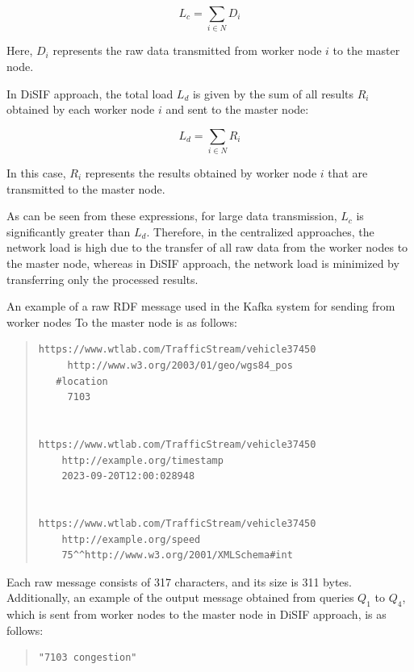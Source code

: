 \documentclass[5p,times]{elsarticle}
\begin{document}
\begin{equation}
    L_c = \sum_{i \in N} D_i
    \end{equation}

Here, \(D_i\) represents the raw data transmitted from worker node \(i\) to the master node.

In DiSIF approach, the total load \(L_d\) is given by the sum of all results \(R_i\)
 obtained by each worker node \(i\) and sent to the master node:


\begin{equation}
    L_d = \sum_{i \in N} R_i
\end{equation}
    
In this case, \(R_i\) represents the results obtained by worker node \(i\)
 that are transmitted to the master node.

As can be seen from these expressions, for large data transmission, \(L_c\)
 is significantly greater than \(L_d\). Therefore, in the centralized approaches,
  the network load is high due to the transfer of all raw data from the worker nodes
   to the master node, whereas in DiSIF approach, the network load is minimized by transferring
    only the processed results.




An example of a raw RDF message used in the Kafka system for sending from worker nodes To
 the master node is as follows:

\small
\begin{quote}
\begin{verbatim}
https://www.wtlab.com/TrafficStream/vehicle37450
	 http://www.w3.org/2003/01/geo/wgs84_pos
   #location
	 7103


https://www.wtlab.com/TrafficStream/vehicle37450 
	http://example.org/timestamp 
	2023-09-20T12:00:028948


https://www.wtlab.com/TrafficStream/vehicle37450
	http://example.org/speed
	75^^http://www.w3.org/2001/XMLSchema#int
\end{verbatim}
\end{quote}

\normalsize %
Each raw message consists of 317 characters, and its size is 311 bytes. Additionally,
 an example of the output message obtained from queries $Q_1$ to $Q_4$, which is sent from worker
  nodes to the master node in DiSIF approach, is as follows:

\small
\begin{quote}
\begin{verbatim}
"7103 congestion"
\end{verbatim}
\end{quote}
\end{document}
